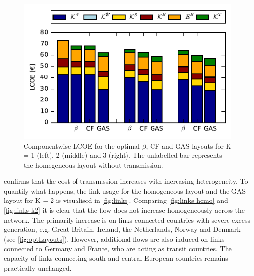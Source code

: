 \documentclass[a4paper, 5p, sort&compress]{elsarticle}%
\begin{document}
\begin{figure}[h!]
  \centering
  \includegraphics[width = \columnwidth]{costVE50}
  \caption{Componentwise LCOE for the optimal $\beta$, CF and GAS layouts
    for K = 1 (left), 2 (middle) and 3 (right). The unlabelled bar
    represents the homogeneous layout without transmission.}
  \label{fig:cost}
\end{figure}

 confirms that the cost of transmission increases
with increasing heterogeneity. To quantify what happens, the link
usage for the homogeneous layout and the GAS layout for K = 2 is
visualised in \cref{fig:links}. Comparing \cref{fig:links-homo} and
\cref{fig:links-k2} it is clear that the flow does not increase
homogeneously across the network. The primarily increase is on links
connected countries with severe excess generation, e.g. Great Britain,
Ireland, the Netherlands, Norway and Denmark (see
\cref{fig:optLayouts}). However, additional flows are also induced on
links connected to Germany and France, who are acting as transit
countries. The capacity of links connecting south and central European
countries remains practically unchanged.
\end{document}
